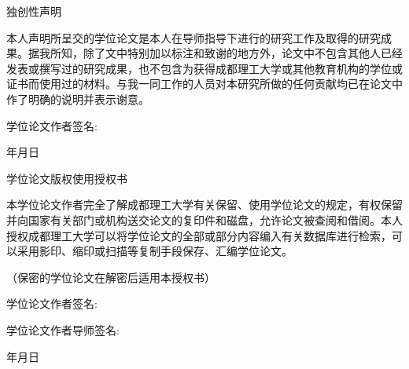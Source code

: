   \newpage
  \thispagestyle{empty}
  \vspace*{44pt}
  \begin{center}{\hei {} 独创性声明}\end{center}
  \par\vspace*{40pt}
  \setlength{\baselineskip}{23pt}
  {\song {}
  本人声明所呈交的学位论文是本人在导师指导下进行的研究工作及取得的研究成果。据我所知，除了文中特别加以标注和致谢的地方外，论文中不包含其他人已经发表或撰写过的研究成果，也不包含为获得成都理工大学或其他教育机构的学位或证书而使用过的材料。与我一同工作的人员对本研究所做的任何贡献均已在论文中作了明确的说明并表示谢意。
  \par \vspace*{20pt}
  学位论文作者签名: \hspace{3.5cm}\hfill \par
  \hfill  年\hspace{1cm}月\hspace{1cm}日
  }

\vfill

\begin{center}{\hei {} 学位论文版权使用授权书}\end{center}
  \par\vspace*{40pt}
  \setlength{\baselineskip}{23pt}
  {\song {}
  本学位论文作者完全了解成都理工大学有关保留、使用学位论文的规定，有权保留并向国家有关部门或机构送交论文的复印件和磁盘，允许论文被查阅和借阅。本人授权成都理工大学可以将学位论文的全部或部分内容编入有关数据库进行检索，可以采用影印、缩印或扫描等复制手段保存、汇编学位论文。

  （保密的学位论文在解密后适用本授权书）
  \par \vspace*{20pt}
  学位论文作者签名: \hspace{3.5cm}\hfill \par
  学位论文作者导师签名: \hspace{3.5cm}\hfill \par
  \hfill   年\hspace{1cm}月\hspace{1cm}日
  }

  \null
  \newpage
  \thispagestyle{empty}
  \cleardoublepage